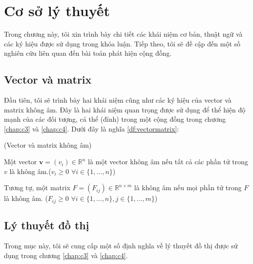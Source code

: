 \chapter{Cơ sở lý thuyết}\label{chap:c2}
\ifpdf
    \graphicspath{{Chapter2/Chapter2Figs/PNG/}{Chapter2/Chapter2Figs/PDF/}{Chapter2/Chapter2Figs/}}
\else
    \graphicspath{{Chapter2/Chapter2Figs/EPS/}{Chapter2/Chapter2Figs/}}
\fi
Trong chương này, tôi xin trình bày chi tiết các khái niệm cơ bản, thuật ngữ và các ký hiệu được sử dụng trong khóa luận. Tiếp theo, tôi sẽ đề cập đến một số nghiên cứu liên quan đến bài toán phát hiện cộng đồng.

\section{Vector và matrix}

Đầu tiên, tôi sẽ trình bày hai khái niệm cũng như các ký hiệu của vector và matrix không âm. Đây là hai khái niệm quan trọng được sử dụng để thể hiện độ mạnh của các đối tượng, cá thể (đỉnh) trong một cộng đồng trong chương \ref{chap:c3} và \ref{chap:c4}. Dưới đây là nghĩa \ref{df:vectormatrix}:

\begin{definition}(Vector và matrix không âm)\label{df:vectormatrix}
	
	Một vector $\textbf{v} = (v_i) \in \mathbb{R}^n$ là một vector không âm nếu tất cả các phần tử trong $v$ là không âm.($v_i \geq 0$ $\forall i \in \{1, \dots, n\}$)
	
	Tương tự, một matrix $F = (F_{ij}) \in \mathbb{R}^{n \times m}$ là không âm nếu mọi phần tử trong $F$ là không âm. ($F_{ij} \geq 0$ $\forall i \in \{1,\dots, n\}, j \in \{1,\dots, m\} $)
\end{definition}

\section{Lý thuyết đồ thị}
Trong mục này, tôi sẽ cung cấp một số định nghĩa về lý thuyết đồ thị được sử dụng trong chương \ref{chap:c3} và \ref{chap:c4}.

